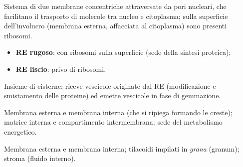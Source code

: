 Sistema di due membrane concentriche attraversate da pori nucleari, che facilitano il trasporto di molecole tra nucleo e citoplasma; sulla superficie dell'involucro (membrana esterna, affacciata al citoplasma) sono presenti ribosomi.

\begin{itemize}
  \item \textbf{RE rugoso}: con ribosomi sulla superficie (sede della sintesi proteica);
  \item \textbf{RE liscio}: privo di ribosomi.
\end{itemize}

Insieme di cisterne; riceve vescicole originate dal RE (modificazione e smistamento delle proteine) ed emette vescicole in fase di gemmazione.

Membrana esterna e membrana interna (che si ripiega formando le creste); matrice interna e compartimento intermembrana; sede del metabolismo energetico.

Membrana esterna e membrana interna; tilacoidi impilati in \textit{grana} (granum); stroma (fluido interno).

